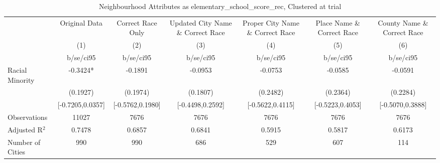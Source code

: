 \documentclass{article}
\begin{document}
\begin{table}[htbp]\centering
\def\sym#1{\ifmmode^{#1}\else\(^{#1}\)\fi}
\caption{Neighbourhood Attributes as elementary\_school\_score\_rec, Clustered at trial}
\begin{tabular}{l*{6}{c}}
\toprule
                    &\multicolumn{1}{c}{Original Data}&\multicolumn{1}{c}{Correct Race Only}&\multicolumn{1}{c}{Updated City Name \& Correct Race}&\multicolumn{1}{c}{Proper City Name \& Correct Race}&\multicolumn{1}{c}{Place Name \& Correct Race}&\multicolumn{1}{c}{County Name \& Correct Race}\\\cmidrule(lr){2-2}\cmidrule(lr){3-3}\cmidrule(lr){4-4}\cmidrule(lr){5-5}\cmidrule(lr){6-6}\cmidrule(lr){7-7}
                    &\multicolumn{1}{c}{(1)}   &\multicolumn{1}{c}{(2)}   &\multicolumn{1}{c}{(3)}   &\multicolumn{1}{c}{(4)}   &\multicolumn{1}{c}{(5)}   &\multicolumn{1}{c}{(6)}   \\
                    &   b/se/ci95   &   b/se/ci95   &   b/se/ci95   &   b/se/ci95   &   b/se/ci95   &   b/se/ci95   \\
\midrule
Racial Minority     &     -0.3424*  &     -0.1891   &     -0.0953   &     -0.0753   &     -0.0585   &     -0.0591   \\
                    &    (0.1927)   &    (0.1974)   &    (0.1807)   &    (0.2482)   &    (0.2364)   &    (0.2284)   \\
                    &[-0.7205,0.0357]   &[-0.5762,0.1980]   &[-0.4498,0.2592]   &[-0.5622,0.4115]   &[-0.5223,0.4053]   &[-0.5070,0.3888]   \\
\midrule
Observations        &       11027   &        7676   &        7676   &        7676   &        7676   &        7676   \\
Adjusted R$^2$      &      0.7478   &      0.6857   &      0.6841   &      0.5915   &      0.5817   &      0.6173   \\
Number of Cities    &         990   &         990   &         686   &         529   &         607   &         114   \\
\bottomrule
\end{tabular}
\end{table}
\end{document}
